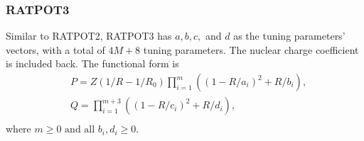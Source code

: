 \documentclass[12pt]{article}
\def\att{                    %
        \marginpar[ \hspace*{\fill} \raisebox{-0.2em}{\rule{2mm}{1.2em}} ]
        {\raisebox{-0.2em}{\rule{2mm}{1.2em}} }
        }
\def\at#1{[*** \att #1 ***]}  %
\begin{document}
\subsubsection{RATPOT3}
Similar to RATPOT2, RATPOT3 has $a, b, c,$ and $d$ as the tuning parameters' vectors, with a total of $4M+8$ tuning parameters. The nuclear charge coefficient is included back. The functional form is
\begin{equation}
    \begin{split}
        &P=Z(1/R-1/R_0)\prod_{i=1}^m ((1-R/a_i)^2+R/b_i), \\
        &Q=\prod_{i=1}^{m+3} ((1-R/c_i)^2+R/d_i), \\
    \end{split}
\end{equation}
where $m\ge 0 \text{ and all } b_i, d_i \ge 0.$

%
\end{document}
